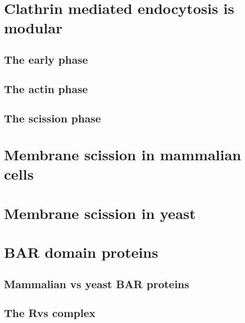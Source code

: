 	
	\section{Clathrin mediated endocytosis is modular}
		\subsection{The early phase}
		\subsection{The actin phase}
		\subsection{The scission phase}
		
		
	\section{Membrane scission in mammalian cells}
	\section{Membrane scission in yeast}
	
		
	\section{BAR domain proteins}
		\subsection{Mammalian vs yeast BAR proteins}
		\subsection{The Rvs complex}		
		
		
	
